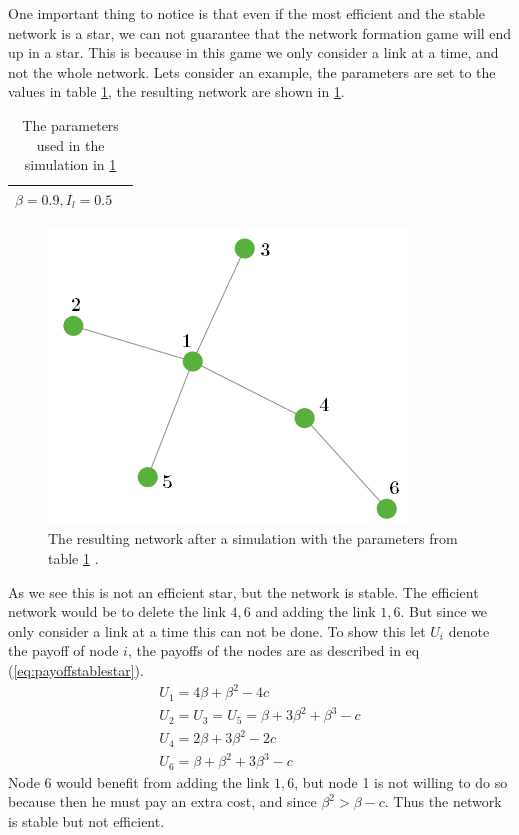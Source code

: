 One important thing to notice is that even if the most efficient and the stable network is a star, we can not guarantee that the network formation game will end up in a star. This is because in this game we only consider a link at a time, and not the whole network.
Lets consider an example, the parameters are set to the values in table \ref{tbl:stablestar}, the resulting network are shown in \ref{fig:stablestar}.
\begin{table}[h]
\centering
\begin{tabular}{lc}
 \hline
  $
  \beta=0.9,
  I_{l}=0.5$\\
  \hline
\end{tabular}
\caption{The parameters used in the simulation in \ref{fig:stablestar} \label{tbl:stablestar}}
\end{table}
\begin{figure}[h]
\centering
  \includegraphics[width=0.5\linewidth]{../Figures/stability/Unefficientbutstablestar.png}
  \caption{\label{fig:stablestar} The resulting network after a simulation with the parameters from table \ref{tbl:stablestar} .}
\end{figure}
As we see this is not an efficient star, but the network is stable. The efficient network would be to delete the link $4,6$ and adding the link $1,6$. But since we only consider a link at a time this can not be done. To show this let $U_{i}$ denote the payoff of node $i$, the payoffs of the nodes are as described in eq (\ref{eq:payoffstablestar}).
\begin{eqnarray}
U_{1}=4\beta+\beta^2-4c\\
U_{2}=U_{3}=U_{5}=\beta+3\beta^2+\beta^3-c\\
U_{4}=2\beta+3\beta^2-2c\\
U_{6}=\beta+\beta^2+3\beta^3-c
\label{eq:payoffstablestar}
\end{eqnarray}
Node $6$ would benefit from adding the link $1,6$, but node 1 is not willing to do so because then he must pay an extra cost, and since $\beta^2>\beta-c$. Thus the network is stable but not efficient. 
